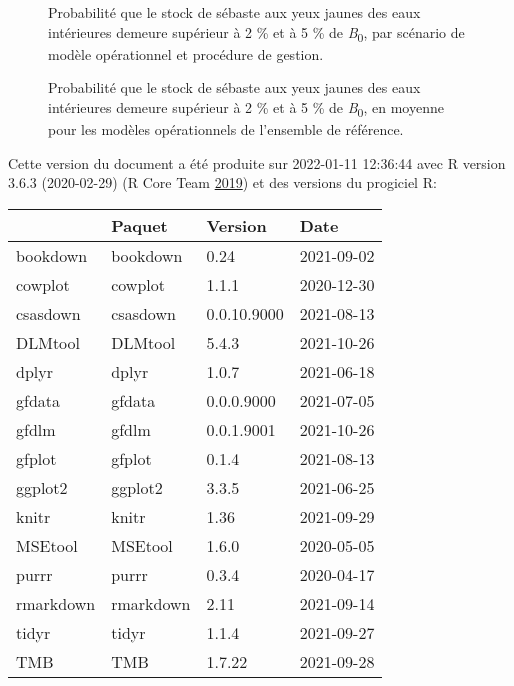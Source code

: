 \documentclass[french,11pt]{book}
\begin{document}
\begin{figure}[htb]

{\centering {} 

}

\caption{Probabilité que le stock de sébaste aux yeux jaunes des eaux intérieures demeure supérieur à 2 \% et à 5 \% de \emph{B}\textsubscript{0}, par scénario de modèle opérationnel et procédure de gestion.}\label{fig:cosewic-all}
\end{figure}
\clearpage


\begin{figure}[htb]

{\centering {} 

}

\caption{Probabilité que le stock de sébaste aux yeux jaunes des eaux intérieures demeure supérieur à 2 \% et à 5 \% de \emph{B}\textsubscript{0}, en moyenne pour les modèles opérationnels de l'ensemble de référence.}\label{fig:cosewic-avg}
\end{figure}
\clearpage


\clearpage

\hypertarget{environnement-informatique}{%
\label{environnement-informatique}}

Cette version du document a été produite sur 2022-01-11 12:36:44 avec R version 3.6.3 (2020-02-29) (R Core Team \protect\hyperlink{ref-r2019}{2019}) et des versions du progiciel R:
\begin{longtable}[]{@{}llll@{}}
\toprule
& Paquet & Version & Date \\
\midrule
\endhead
bookdown & bookdown & 0.24 & 2021-09-02 \\
cowplot & cowplot & 1.1.1 & 2020-12-30 \\
csasdown & csasdown & 0.0.10.9000 & 2021-08-13 \\
DLMtool & DLMtool & 5.4.3 & 2021-10-26 \\
dplyr & dplyr & 1.0.7 & 2021-06-18 \\
gfdata & gfdata & 0.0.0.9000 & 2021-07-05 \\
gfdlm & gfdlm & 0.0.1.9001 & 2021-10-26 \\
gfplot & gfplot & 0.1.4 & 2021-08-13 \\
ggplot2 & ggplot2 & 3.3.5 & 2021-06-25 \\
knitr & knitr & 1.36 & 2021-09-29 \\
MSEtool & MSEtool & 1.6.0 & 2020-05-05 \\
purrr & purrr & 0.3.4 & 2020-04-17 \\
rmarkdown & rmarkdown & 2.11 & 2021-09-14 \\
tidyr & tidyr & 1.1.4 & 2021-09-27 \\
TMB & TMB & 1.7.22 & 2021-09-28 \\
\bottomrule
\end{longtable}
\vspace{4mm}
\end{document}
